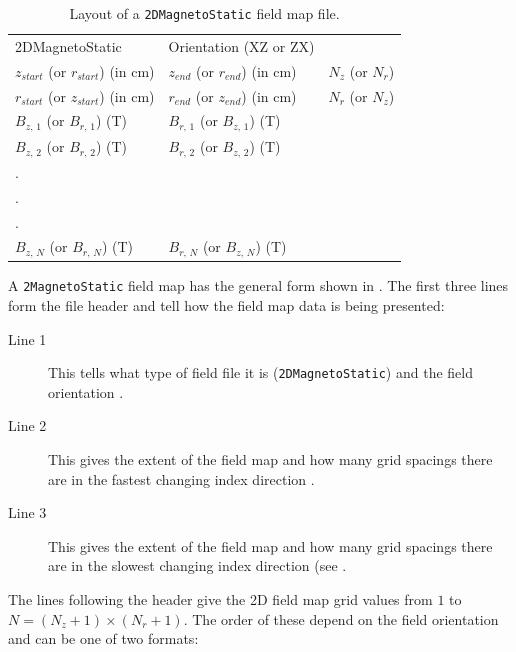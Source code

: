 \begin{table}[ht!]
    \caption{Layout of a \texttt{2DMagnetoStatic} field map file.}
    \label{tab:2DMagnetoStatic}
    \begin{center}
    \begin{tabular}{lll}
      \hline
      2DMagnetoStatic & Orientation (XZ or ZX) & \\
      $z_{start}$ (or $r_{start}$) (in cm) & $z_{end}$ (or $r_{end}$) (in cm) & $N_{z}$ (or $N_{r}$) \\
      $r_{start}$ (or $z_{start}$) (in cm) & $r_{end}$ (or $z_{end}$) (in cm) & $N_{r}$ (or $N_{z}$) \\
      $B_{z,\,1}$ (or $B_{r,\,1}$) (T) & $B_{r,\,1}$ (or $B_{z,\,1}$) (T)& \\
      $B_{z,\,2}$ (or $B_{r,\,2}$) (T) & $B_{r,\,2}$ (or $B_{z,\,2}$) (T)& \\
      . & & \\
      . & & \\
      . & & \\
      $B_{z,\,N}$ (or $B_{r,\,N}$) (T) & $B_{r,\,N}$ (or $B_{z,\,N}$) (T)& \\
      \hline
    \end{tabular}
    \end{center}
\end{table}

A \texttt{2MagnetoStatic} field map has the general form shown in . The first three lines form
the file header and tell \opalt how the field map data is being presented:

\begin{description}
\item[Line 1] This tells \opalt what type of field file it is (\texttt{2DMagnetoStatic}) and the field orientation
  .
\item[Line 2] This gives the extent of the field map and how many grid spacings there are in the fastest changing
  index direction .
\item[Line 3] This gives the extent of the field map and how many grid spacings there are in the slowest changing
  index direction (see .
\end{description}

The lines following the header give the 2D field map grid values from $1$ to $N = (N_{z} + 1) \times (N_{r} + 1)$.
The order of these depend on the field orientation  and can be one of two formats:

